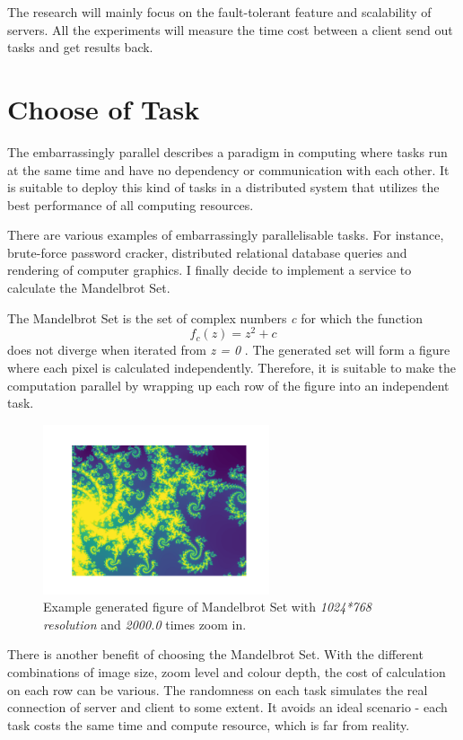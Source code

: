 \documentclass[runningheads,a4paper]{llncs}
\begin{document}
The research will mainly focus on the fault-tolerant feature and scalability of servers. All the experiments will measure the time cost between a client send out tasks and get results back. 

\section{Choose of Task}
The embarrassingly parallel describes a paradigm in computing where tasks run at the same time and have no dependency or communication with each other\cite{parallel}. It is suitable to deploy this kind of tasks in a distributed system that utilizes the best performance of all computing resources.

There are various examples of embarrassingly parallelisable tasks. For instance, brute-force password cracker, distributed relational database queries and rendering of computer graphics. I finally decide to implement a service to calculate the Mandelbrot Set. 

The Mandelbrot Set is the set of complex numbers \emph{c} for which the function
\begin{equation}
f_{c}(z)=z^{2}+c
\end{equation}
does not diverge when iterated from \emph{z = 0} \cite{Mandelbrot}. The generated set will form a figure where each pixel is calculated independently. Therefore, it is suitable to make the computation parallel by wrapping up each row of the figure into an independent task.

\begin{figure}[htbp]
\begin{center}
\includegraphics[height=5cm]{./result_zoom_2000.0.png}
\caption{Example generated figure of Mandelbrot Set with \emph{1024*768 resolution} and \emph{2000.0} times zoom in.}
\label{Mandelbrot Set Figure}
\end{center}
\end{figure}

There is another benefit of choosing the Mandelbrot Set. With the different combinations of image size, zoom level and colour depth, the cost of calculation on each row can be various. The randomness on each task simulates the real connection of server and client to some extent. It avoids an ideal scenario - each task costs the same time and compute resource, which is far from reality.
\end{document}
